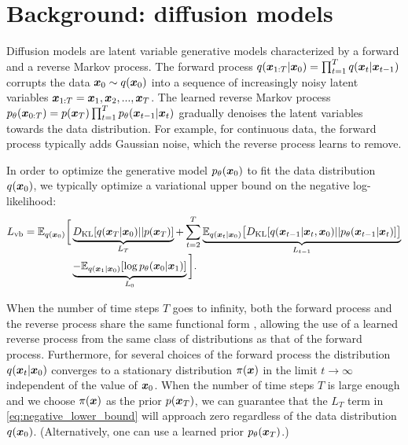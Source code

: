 \section{Background: diffusion models}
\label{sec:background}

Diffusion models \citep{sohl2015deep} are latent variable generative models characterized by a forward and a reverse Markov process. The forward process $q(\boldsymbol{x}_{1:T}|\boldsymbol{x}_0) = \prod_{t=1}^T q(\boldsymbol{x}_t|\boldsymbol{x}_{t-1})$ corrupts the data $\boldsymbol{x}_0 \sim q(\boldsymbol{x}_0)$ into a sequence of increasingly noisy latent variables $\boldsymbol{x}_{1:T} = \boldsymbol{x}_1, \boldsymbol{x}_2, ..., \boldsymbol{x}_T$. The learned reverse Markov process $p_{\theta}(\boldsymbol{x}_{0:T}) = p(\boldsymbol{x}_{T})\prod_{t=1}^T p_{\theta}(\boldsymbol{x}_{t-1}|\boldsymbol{x}_{t})$ gradually denoises the latent variables towards the data distribution. For example, for continuous data, the forward process typically adds Gaussian noise, which the reverse process learns to remove.

In order to optimize the generative model $p_{\theta}(\boldsymbol{x}_{0})$ to fit the data distribution $q(\boldsymbol{x}_0)$, we typically optimize a variational upper bound on the negative log-likelihood:
\begin{align}
    L_{\mathrm{vb}} = \mathbb E_{q(\boldsymbol{x}_0)}\bigg[&
       \underbrace{D_{\mathrm{KL}}[q(\boldsymbol{x}_T | \boldsymbol{x}_0) \vert\vert p(\boldsymbol{x}_T)]}_{L_T}
    + \sum_{t=2}^T \underbrace{\mathbb E_{q(\boldsymbol{x}_t|\boldsymbol{x}_0)} \big[
        D_{\mathrm{KL}}[q(\boldsymbol{x}_{t-1} | \boldsymbol{x}_t, \boldsymbol{x}_0) \vert\vert 
        p_{\theta}(\boldsymbol{x}_{t-1}|\boldsymbol{x}_t)]
        \big]}_{L_{t-1}} \nonumber \\[-0.5em]
      &\underbrace{- \mathbb E_{q(\boldsymbol{x}_1|\boldsymbol{x}_0)} [\log p_{\theta}(\boldsymbol{x}_0|\boldsymbol{x}_1)]}_{L_0}
    \bigg].
    \label{eq:negative_lower_bound}
\end{align}

When the number of time steps $T$ goes to infinity, both the forward process and the reverse process share the same functional form \citep{feller1949theory}, allowing the use of a learned reverse process from the same class of distributions as that of the forward process.     
Furthermore, for several choices of the forward process the distribution $q(\boldsymbol{x}_t|\boldsymbol{x}_{0})$ converges to a stationary distribution $\pi(\boldsymbol{x})$ in the limit $t \rightarrow \infty$ independent of the value of $\boldsymbol{x}_0$.
When the number of time steps $T$ is large enough and
we choose $\pi(\boldsymbol{x})$ as the prior $p(\boldsymbol{x}_T)$,
we can guarantee that the 
$L_T$ term in \eqref{eq:negative_lower_bound} will approach zero regardless of the data distribution $q(\boldsymbol{x}_0)$.
(Alternatively, one can use a learned prior $p_\theta(\boldsymbol{x}_T)$.)

